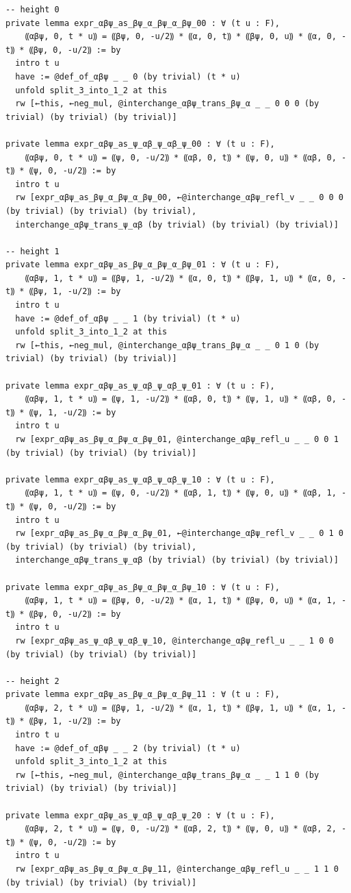 \begin{Verbatim}
-- height 0
private lemma expr_αβψ_as_βψ_α_βψ_α_βψ_00 : ∀ (t u : F),
    ⸨αβψ, 0, t * u⸩ = ⸨βψ, 0, -u/2⸩ * ⸨α, 0, t⸩ * ⸨βψ, 0, u⸩ * ⸨α, 0, -t⸩ * ⸨βψ, 0, -u/2⸩ := by
  intro t u
  have := @def_of_αβψ _ _ 0 (by trivial) (t * u)
  unfold split_3_into_1_2 at this
  rw [←this, ←neg_mul, @interchange_αβψ_trans_βψ_α _ _ 0 0 0 (by trivial) (by trivial) (by trivial)]

private lemma expr_αβψ_as_ψ_αβ_ψ_αβ_ψ_00 : ∀ (t u : F),
    ⸨αβψ, 0, t * u⸩ = ⸨ψ, 0, -u/2⸩ * ⸨αβ, 0, t⸩ * ⸨ψ, 0, u⸩ * ⸨αβ, 0, -t⸩ * ⸨ψ, 0, -u/2⸩ := by
  intro t u
  rw [expr_αβψ_as_βψ_α_βψ_α_βψ_00, ←@interchange_αβψ_refl_v _ _ 0 0 0 (by trivial) (by trivial) (by trivial),
  interchange_αβψ_trans_ψ_αβ (by trivial) (by trivial) (by trivial)]

-- height 1
private lemma expr_αβψ_as_βψ_α_βψ_α_βψ_01 : ∀ (t u : F),
    ⸨αβψ, 1, t * u⸩ = ⸨βψ, 1, -u/2⸩ * ⸨α, 0, t⸩ * ⸨βψ, 1, u⸩ * ⸨α, 0, -t⸩ * ⸨βψ, 1, -u/2⸩ := by
  intro t u
  have := @def_of_αβψ _ _ 1 (by trivial) (t * u)
  unfold split_3_into_1_2 at this
  rw [←this, ←neg_mul, @interchange_αβψ_trans_βψ_α _ _ 0 1 0 (by trivial) (by trivial) (by trivial)]

private lemma expr_αβψ_as_ψ_αβ_ψ_αβ_ψ_01 : ∀ (t u : F),
    ⸨αβψ, 1, t * u⸩ = ⸨ψ, 1, -u/2⸩ * ⸨αβ, 0, t⸩ * ⸨ψ, 1, u⸩ * ⸨αβ, 0, -t⸩ * ⸨ψ, 1, -u/2⸩ := by
  intro t u
  rw [expr_αβψ_as_βψ_α_βψ_α_βψ_01, @interchange_αβψ_refl_u _ _ 0 0 1 (by trivial) (by trivial) (by trivial)]

private lemma expr_αβψ_as_ψ_αβ_ψ_αβ_ψ_10 : ∀ (t u : F),
    ⸨αβψ, 1, t * u⸩ = ⸨ψ, 0, -u/2⸩ * ⸨αβ, 1, t⸩ * ⸨ψ, 0, u⸩ * ⸨αβ, 1, -t⸩ * ⸨ψ, 0, -u/2⸩ := by
  intro t u
  rw [expr_αβψ_as_βψ_α_βψ_α_βψ_01, ←@interchange_αβψ_refl_v _ _ 0 1 0 (by trivial) (by trivial) (by trivial),
  interchange_αβψ_trans_ψ_αβ (by trivial) (by trivial) (by trivial)]

private lemma expr_αβψ_as_βψ_α_βψ_α_βψ_10 : ∀ (t u : F),
    ⸨αβψ, 1, t * u⸩ = ⸨βψ, 0, -u/2⸩ * ⸨α, 1, t⸩ * ⸨βψ, 0, u⸩ * ⸨α, 1, -t⸩ * ⸨βψ, 0, -u/2⸩ := by
  intro t u
  rw [expr_αβψ_as_ψ_αβ_ψ_αβ_ψ_10, @interchange_αβψ_refl_u _ _ 1 0 0 (by trivial) (by trivial) (by trivial)]

-- height 2
private lemma expr_αβψ_as_βψ_α_βψ_α_βψ_11 : ∀ (t u : F),
    ⸨αβψ, 2, t * u⸩ = ⸨βψ, 1, -u/2⸩ * ⸨α, 1, t⸩ * ⸨βψ, 1, u⸩ * ⸨α, 1, -t⸩ * ⸨βψ, 1, -u/2⸩ := by
  intro t u
  have := @def_of_αβψ _ _ 2 (by trivial) (t * u)
  unfold split_3_into_1_2 at this
  rw [←this, ←neg_mul, @interchange_αβψ_trans_βψ_α _ _ 1 1 0 (by trivial) (by trivial) (by trivial)]

private lemma expr_αβψ_as_ψ_αβ_ψ_αβ_ψ_20 : ∀ (t u : F),
    ⸨αβψ, 2, t * u⸩ = ⸨ψ, 0, -u/2⸩ * ⸨αβ, 2, t⸩ * ⸨ψ, 0, u⸩ * ⸨αβ, 2, -t⸩ * ⸨ψ, 0, -u/2⸩ := by
  intro t u
  rw [expr_αβψ_as_βψ_α_βψ_α_βψ_11, @interchange_αβψ_refl_u _ _ 1 1 0 (by trivial) (by trivial) (by trivial)]


\end{Verbatim}
